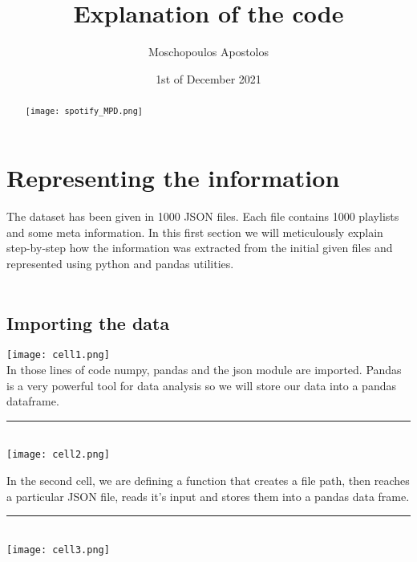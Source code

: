 \documentclass[]{article}
\title{Explanation of the code}
\author{Moschopoulos Apostolos}
\date{1st of December 2021}
\begin{document}
\maketitle

\begin{abstract}
\texttt{[image: spotify\_MPD.png]}
\end{abstract}

\section{Representing the information}
The dataset has been given in 1000 JSON files. Each file contains 1000 playlists
and some meta information. In this first section we will meticulously explain step-by-step how the information was extracted from the initial given files and represented using python and pandas utilities.\\
\\
\subsection{Importing the data}
\texttt{[image: cell1.png]}
\\
In those lines of code numpy, pandas and the json module are imported. Pandas is a very powerful tool for data analysis so we will store our data into a pandas dataframe.\\
\noindent
{\color{Blue} \rule{\linewidth}{0.5mm}}
\\
\texttt{[image: cell2.png]}


In the second cell, we are defining a function that creates a file path, then reaches a particular JSON file, reads it's input and stores them into a pandas data frame. 
\\
\noindent
{\color{Blue} \rule{\linewidth}{0.5mm}}
\\
\texttt{[image: cell3.png]}
\end{document}
